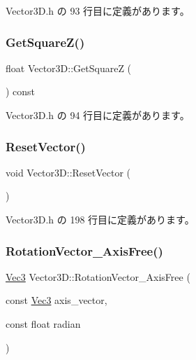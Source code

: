  Vector3\+D.\+h の 93 行目に定義があります。

\mbox{\label{class_vector3_d_a8ede9efe34b69e067153688aea96574f}} 
\subsubsection{\texorpdfstring{Get\+Square\+Z()}{GetSquareZ()}}
{\footnotesize\ttfamily float Vector3\+D\+::\+Get\+SquareZ (\begin{DoxyParamCaption}{ }\end{DoxyParamCaption}) const\hspace{0.3cm}{\ttfamily [inline]}}



 Vector3\+D.\+h の 94 行目に定義があります。

\mbox{\label{class_vector3_d_a9cfe261f14b3b2e6704c5649058d3ecd}} 
\subsubsection{\texorpdfstring{Reset\+Vector()}{ResetVector()}}
{\footnotesize\ttfamily void Vector3\+D\+::\+Reset\+Vector (\begin{DoxyParamCaption}{ }\end{DoxyParamCaption})\hspace{0.3cm}{\ttfamily [inline]}}



 Vector3\+D.\+h の 198 行目に定義があります。

\mbox{\label{class_vector3_d_aadbe9f3e0ee3298c59cf123b592140bd}} 
\subsubsection{\texorpdfstring{Rotation\+Vector\+\_\+\+Axis\+Free()}{RotationVector\_AxisFree()}}
{\footnotesize\ttfamily \mbox{\hyperlink{_vector3_d_8h_ab16f59e4393f29a01ec8b9bbbabbe65d}{Vec3}} Vector3\+D\+::\+Rotation\+Vector\+\_\+\+Axis\+Free (\begin{DoxyParamCaption}\item[{const \mbox{\hyperlink{_vector3_d_8h_ab16f59e4393f29a01ec8b9bbbabbe65d}{Vec3}}}]{axis\+\_\+vector,  }\item[{const float}]{radian }\end{DoxyParamCaption})\hspace{0.3cm}{\ttfamily [inline]}}



